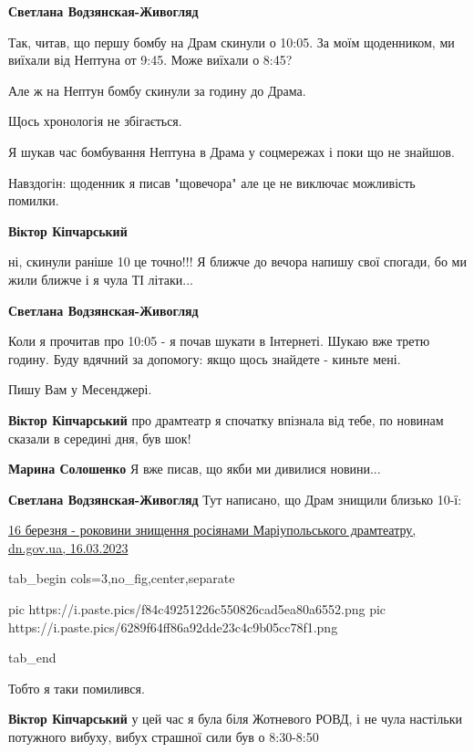 \begin{itemize} %
\textbf{Светлана Водзянская-Живогляд} 

Так, читав, що першу бомбу на Драм скинули о 10:05. За моїм щоденником, ми
виїхали від Нептуна от 9:45. Може виїхали о 8:45?

Але ж на Нептун бомбу скинули за годину до Драма.

Щось хронологія не збігається.

Я шукав час бомбування Нептуна в Драма у соцмережах і поки що не знайшов.

Навздогін: щоденник я писав "щовечора" але це не виключає можливість помилки.

\textbf{Віктор Кіпчарський} 

ні, скинули раніше 10 це точно!!! Я ближче до вечора напишу свої спогади, бо ми
жили ближче і я чула ТІ літаки...

\textbf{Светлана Водзянская-Живогляд} 

Коли я прочитав про 10:05 - я почав шукати в Інтернеті. Шукаю вже третю годину.
Буду вдячний за допомогу: якщо щось знайдете - киньте мені.

Пишу Вам у Месенджері.

\textbf{Віктор Кіпчарський} про драмтеатр я спочатку впізнала від тебе, по новинам сказали в середині дня, був шок!

\textbf{Марина Солошенко} Я вже писав, що якби ми дивилися новини...

\textbf{Светлана Водзянская-Живогляд} Тут написано, що Драм знищили близько 10-ї:

\href{https://dn.gov.ua/news/16-bereznya-rokovini-znishchennya-rosiyanami-mariupolskogo-dramteatru}{%
16 березня - роковини знищення росіянами Маріупольського драмтеатру, dn.gov.ua, 16.03.2023%
}

\ifcmt
  tab_begin cols=3,no_fig,center,separate

     pic https://i.paste.pics/f84c49251226c550826cad5ea80a6552.png
		 pic https://i.paste.pics/6289f64ff86a92dde23c4c9b05cc78f1.png

  tab_end
\fi

Тобто я таки помилився.

\textbf{Віктор Кіпчарський} у цей час я була біля Жотневого РОВД, і не чула настільки потужного вибуху, вибух страшної сили був о 8:30-8:50


\end{itemize}
